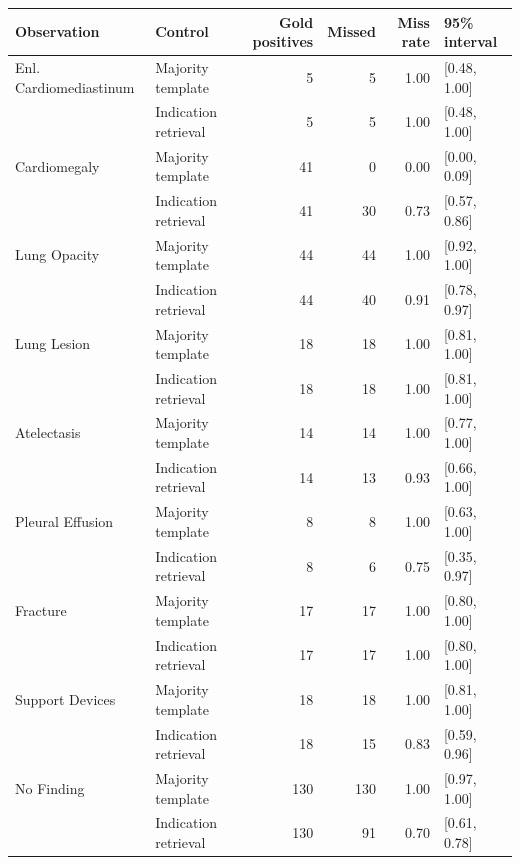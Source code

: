 \begingroup
\setlength{\tabcolsep}{4pt}
\begin{tabular}{llrrrl}
\toprule
Observation & Control & Gold positives & Missed & Miss rate & 95\% interval \\
\midrule
Enl. Cardiomediastinum & Majority template & 5 & 5 & 1.00 & [0.48, 1.00] \\
 & Indication retrieval & 5 & 5 & 1.00 & [0.48, 1.00] \\
Cardiomegaly & Majority template & 41 & 0 & 0.00 & [0.00, 0.09] \\
 & Indication retrieval & 41 & 30 & 0.73 & [0.57, 0.86] \\
Lung Opacity & Majority template & 44 & 44 & 1.00 & [0.92, 1.00] \\
 & Indication retrieval & 44 & 40 & 0.91 & [0.78, 0.97] \\
Lung Lesion & Majority template & 18 & 18 & 1.00 & [0.81, 1.00] \\
 & Indication retrieval & 18 & 18 & 1.00 & [0.81, 1.00] \\
Atelectasis & Majority template & 14 & 14 & 1.00 & [0.77, 1.00] \\
 & Indication retrieval & 14 & 13 & 0.93 & [0.66, 1.00] \\
Pleural Effusion & Majority template & 8 & 8 & 1.00 & [0.63, 1.00] \\
 & Indication retrieval & 8 & 6 & 0.75 & [0.35, 0.97] \\
Fracture & Majority template & 17 & 17 & 1.00 & [0.80, 1.00] \\
 & Indication retrieval & 17 & 17 & 1.00 & [0.80, 1.00] \\
Support Devices & Majority template & 18 & 18 & 1.00 & [0.81, 1.00] \\
 & Indication retrieval & 18 & 15 & 0.83 & [0.59, 0.96] \\
No Finding & Majority template & 130 & 130 & 1.00 & [0.97, 1.00] \\
 & Indication retrieval & 130 & 91 & 0.70 & [0.61, 0.78] \\
\bottomrule
\end{tabular}
\endgroup
